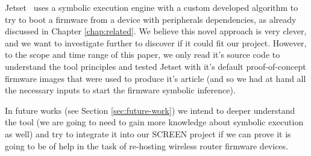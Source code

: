 Jetset~\cite{jetset} uses a symbolic execution engine with a custom developed algorithm to try to boot a firmware from a device with peripherals dependencies, as already discussed in Chapter \ref{chap:related}. We believe this novel approach is very clever, and we want to investigate further to discover if it could fit our project. However, to the scope and time range of this paper, we only read it's source code to understand the tool principles and tested Jetset with it's default proof-of-concept firmware images that were used to produce it's article (and so we had at hand all the necessary inputs to start the firmware symbolic inference).

In future works (see Section \ref{sec:future-work}) we intend to deeper understand the tool (we are going to need to gain more knowledge about symbolic execution as well) and try to integrate it into our SCREEN project if we can prove it is going to be of help in the task of re-hosting wireless router firmware devices.